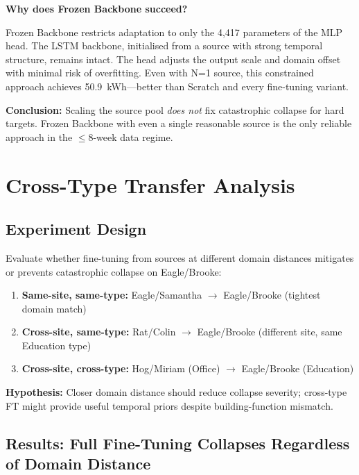 \documentclass[12pt,a4paper]{report}
\begin{document}
\textbf{Why does Frozen Backbone succeed?}

Frozen Backbone restricts adaptation to only the 4,417 parameters of the MLP head. The LSTM backbone, initialised from a source with strong temporal structure, remains intact. The head adjusts the output scale and domain offset with minimal risk of overfitting. Even with N=1 source, this constrained approach achieves 50.9~kWh---better than Scratch and every fine-tuning variant.

\textbf{Conclusion:} Scaling the source pool \textit{does not} fix catastrophic collapse for hard targets. Frozen Backbone with even a single reasonable source is the only reliable approach in the $\leq$8-week data regime.

\section{Cross-Type Transfer Analysis}

\subsection{Experiment Design}

Evaluate whether fine-tuning from sources at different domain distances mitigates or prevents catastrophic collapse on Eagle/Brooke:

\begin{enumerate}
    \item \textbf{Same-site, same-type:} Eagle/Samantha $\to$ Eagle/Brooke (tightest domain match)
    \item \textbf{Cross-site, same-type:} Rat/Colin $\to$ Eagle/Brooke (different site, same Education type)
    \item \textbf{Cross-site, cross-type:} Hog/Miriam (Office) $\to$ Eagle/Brooke (Education)
\end{enumerate}

\textbf{Hypothesis:} Closer domain distance should reduce collapse severity; cross-type FT might provide useful temporal priors despite building-function mismatch.

\subsection{Results: Full Fine-Tuning Collapses Regardless of Domain Distance}
\end{document}
